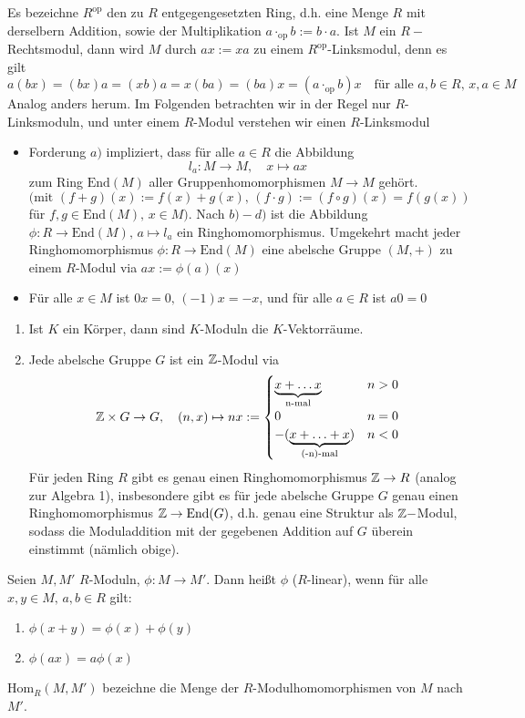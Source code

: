 \begin{anm}
	Es bezeichne $R^\text{op}$ den zu $R$ entgegengesetzten Ring, d.h. eine Menge $R$ mit derselbern Addition, sowie der Multiplikation $a \cdot_\text{op}b := b \cdot a$. Ist $M$ ein $R-$Rechtsmodul, dann wird $M$ durch $ax:= xa$ zu einem $R^\text{op}$-Linksmodul, denn es gilt 
	$$a(bx) = (bx)a = (xb)a = x(ba) = (ba)x = (a \cdot_\text{op} b)x \quad \text{für alle } a,b\in R, \, x,a\in M$$
	Analog anders herum. Im Folgenden betrachten wir in der Regel nur $R$-Linksmoduln, und unter einem $R$-Modul verstehen wir einen $R$-Linksmodul
	\begin{itemize}
		\item Forderung $a)$ impliziert, dass für alle $a\in R$ die Abbildung 
		$$l_a: M \to M, \quad x\mapsto ax$$
		zum Ring $\text{End}(M)$ aller Gruppenhomomorphismen $M\to M$ gehört.
		$$(\text{mit } (f+g)(x) := f(x) + g(x), \, (f\cdot g) := (f\circ g)(x) = f(g(x))$$für $f,g\in \text{End}(M), \, x\in M)$. Nach $b)-d)$ ist die Abbildung $\phi:R\to \text{End}(M), \, a\mapsto l_a$ ein Ringhomomorphismus. Umgekehrt macht jeder Ringhomomorphismus $\phi:R\to \text{End}(M)$ eine abelsche Gruppe $(M,+)$ zu einem $R$-Modul via $ax:= \phi(a)(x)$
		\item Für alle $x\in M$ ist $0x=0, \, (-1)x=-x$, und für alle $a\in R$ ist $a0=0$ 
	\end{itemize}
\end{anm}
\begin{bsp}\label{1.2}
	\begin{enumerate}[label=\alph*)]
		\item Ist $K$ ein Körper, dann sind $K$-Moduln die $K$-Vektorräume.
		\item Jede abelsche Gruppe $G$ ist ein $\mathbb{Z}$-Modul via
		$$\mathbb{Z}\times G\to G, \quad (n,x) \mapsto nx:= \begin{cases} \underbrace{x+ \ldots x}_{\text{n-mal}}& n>0 \\
		0 & n=0\\
		-(\underbrace{x+ \ldots + x}_{\text{(-n)-mal}}) & n<0
		\end{cases}$$
		Für jeden Ring $R$ gibt es genau einen Ringhomomorphismus $\mathbb{Z}\to R$ (analog zur Algebra 1), insbesondere gibt es für jede abelsche Gruppe $G$ genau einen Ringhomomorphismus $\mathbb{Z}\to \text{End}(G)$, d.h. genau eine Struktur als $\mathbb{Z}-$Modul, sodass die Moduladdition mit der gegebenen Addition auf $G$ überein einstimmt (nämlich obige).
	\end{enumerate}
\end{bsp}
\begin{df}\label{1.3}
	Seien $M,M'$ $R$-Moduln, $\phi:M \to M'$. Dann heißt $\phi$  ($R$-linear), wenn für alle $x,y\in M, \, a,b\in R$ gilt: 
	\begin{enumerate}[label=\alph*)]
		\item $\phi(x+y) = \phi(x) + \phi(y)$
		\item $\phi(ax) = a\phi(x)$
	\end{enumerate}
	$\text{Hom}_R(M, M')$ bezeichne die Menge der $R$-Modulhomomorphismen von $M$ nach $M'$.
\end{df}
